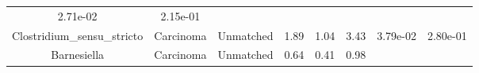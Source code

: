 \documentclass[12pt,]{article}
\begin{document}
\begin{longtable}[]{@{}cccccccc@{}}
\begin{minipage}[t]{0.06\columnwidth}
2.71e-02\strut
\end{minipage} & \begin{minipage}[t]{0.06\columnwidth}\centering\strut
2.15e-01\strut
\end{minipage}\tabularnewline
\begin{minipage}[t]{0.18\columnwidth}\centering\strut
Clostridium\_sensu\_stricto\strut
\end{minipage} & \begin{minipage}[t]{0.07\columnwidth}\centering\strut
Carcinoma\strut
\end{minipage} & \begin{minipage}[t]{0.09\columnwidth}\centering\strut
Unmatched\strut
\end{minipage} & \begin{minipage}[t]{0.03\columnwidth}\centering\strut
1.89\strut
\end{minipage} & \begin{minipage}[t]{0.14\columnwidth}\centering\strut
1.04\strut
\end{minipage} & \begin{minipage}[t]{0.14\columnwidth}\centering\strut
3.43\strut
\end{minipage} & \begin{minipage}[t]{0.06\columnwidth}\centering\strut
3.79e-02\strut
\end{minipage} & \begin{minipage}[t]{0.06\columnwidth}\centering\strut
2.80e-01\strut
\end{minipage}\tabularnewline
\begin{minipage}[t]{0.18\columnwidth}\centering\strut
Barnesiella\strut
\end{minipage} & \begin{minipage}[t]{0.07\columnwidth}\centering\strut
Carcinoma\strut
\end{minipage} & \begin{minipage}[t]{0.09\columnwidth}\centering\strut
Unmatched\strut
\end{minipage} & \begin{minipage}[t]{0.03\columnwidth}\centering\strut
0.64\strut
\end{minipage} & \begin{minipage}[t]{0.14\columnwidth}\centering\strut
0.41\strut
\end{minipage} & \begin{minipage}[t]{0.14\columnwidth}\centering\strut
0.98\strut
\end{minipage} & \begin{minipage}[t]{0.06\columnwidth}\centering\strut

\end{minipage}
\end{longtable}
\end{document}
